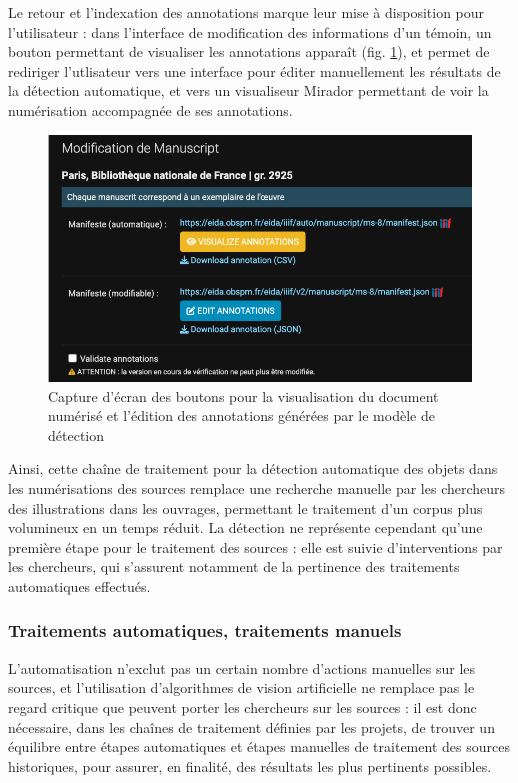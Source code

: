 	Le retour et l'indexation des annotations marque leur mise à disposition pour l'utilisateur : dans l'interface de modification des informations d'un témoin, un bouton permettant de visualiser les annotations apparaît (fig. \ref{fig:eida_buttons}), et permet de rediriger l'utlisateur vers une interface pour éditer manuellement les résultats de la détection automatique, et vers un visualiseur Mirador permettant de voir la numérisation accompagnée de ses annotations.	
	
	\begin{figure}[h]
		\centering
		\includegraphics[width=12cm]{images/eida_buttons.png}
		\caption{Capture d'écran des boutons pour la visualisation du document numérisé et l'édition des annotations générées par le modèle de détection}
		\label{fig:eida_buttons}
	\end{figure}
	
	Ainsi, cette chaîne de traitement pour la détection automatique des objets dans les numérisations des sources remplace une recherche manuelle par les chercheurs des illustrations dans les ouvrages, permettant le traitement d'un corpus plus volumineux en un temps réduit. La détection ne représente cependant qu'une première étape pour le traitement des sources : elle est suivie d'interventions par les chercheurs, qui s'assurent notamment de la pertinence des traitements automatiques effectués.

    \subsubsection{Traitements automatiques, traitements manuels}
   	L'automatisation n'exclut pas un certain nombre d'actions manuelles sur les sources, et l'utilisation d'algorithmes de vision artificielle ne remplace pas le regard critique que peuvent porter les chercheurs sur les sources : il est donc nécessaire, dans les chaînes de traitement définies par les projets, de trouver un équilibre entre étapes automatiques et étapes manuelles de traitement des sources historiques, pour assurer, en finalité, des résultats les plus pertinents possibles.
   	
